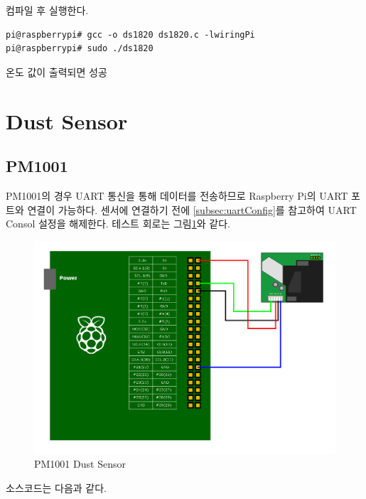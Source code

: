 \documentclass[11pt
  , a4paper
  , article
  , oneside
]{memoir}
\begin{document}
컴파일 후 실행한다.
\begin{lstlisting}[style=termstyle]
pi@raspberrypi# gcc -o ds1820 ds1820.c -lwiringPi
pi@raspberrypi# sudo ./ds1820
\end{lstlisting}
온도 값이 출력되면 성공
\section{Dust Sensor}
\subsection{PM1001}\label{subsec:pm1001Test}
PM1001의 경우 UART 통신을 통해 데이터를 전송하므로 Raspberry Pi의 UART 포트와 연결이 가능하다.
센서에 연결하기 전에 \ref{subsec:uartConfig}를 참고하여 UART Consol 설정을 해제한다.
테스트 회로는 그림\ref{fig:pm1001_test}와 같다.
\begin{figure}[!htb]
\centering
\includegraphics[width=1\textwidth]{./images/epics/PM1001Test.png}
\caption{PM1001 Dust Sensor}
\label{fig:pm1001_test}
\end{figure}
소스코드는 다음과 같다.
\end{document}
